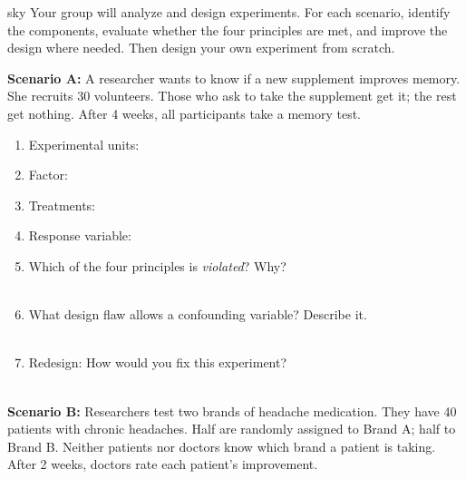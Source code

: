 \documentclass[10pt]{article}
\begin{document}
\namepartnerperiod

\vspace{0.1in}

\begin{scenariobox}[Context]{sky}
\small
Your group will analyze and design experiments. For each scenario, identify the
components, evaluate whether the four principles are met, and improve the design
where needed. Then design your own experiment from scratch.
\end{scenariobox}

\vspace{0.1in}

\textbf{Scenario A:} A researcher wants to know if a new supplement improves memory.
She recruits 30 volunteers. Those who ask to take the supplement get it; the rest get
nothing. After 4 weeks, all participants take a memory test.

\begin{practicebox}
\small
\begin{enumerate}[leftmargin=1.5em, itemsep=7pt]
  \item Experimental units: \blank{8cm}
  \item Factor: \blank{8cm}
  \item Treatments: \blank{8cm}
  \item Response variable: \blank{8cm}
  \item Which of the four principles is \emph{violated}? \blank{5cm} Why?\\
        \writeline\\[1pt]\writeline
  \item What design flaw allows a confounding variable? Describe it.\\
        \writeline\\[1pt]\writeline
  \item Redesign: How would you fix this experiment?\\
        \writeline\\[1pt]\writeline
\end{enumerate}
\end{practicebox}

\vspace{0.1in}

\textbf{Scenario B:} Researchers test two brands of headache medication. They have
40 patients with chronic headaches. Half are randomly assigned to Brand A;
half to Brand B. Neither patients nor doctors know which brand a patient is taking.
After 2 weeks, doctors rate each patient's improvement.
\end{document}
